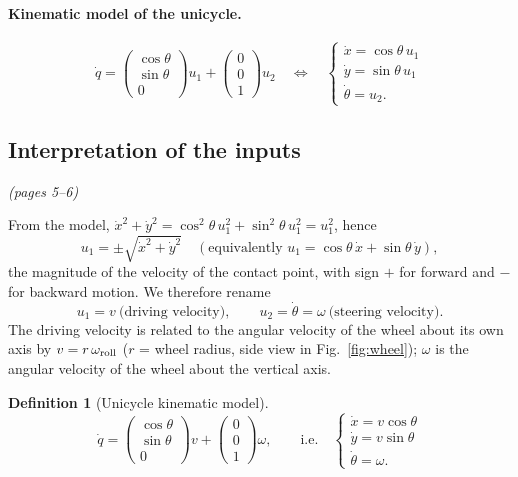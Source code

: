 \documentclass[11pt,a4paper]{article}
\newcommand{\dq}{\dot q}
\theoremstyle{definition}
\newtheorem{definition}[theorem]{Definition}
\begin{document}
\paragraph{Kinematic model of the unicycle.}
\[
\dq=\begin{pmatrix}\cos\theta\\ \sin\theta\\ 0\end{pmatrix}u_1+\begin{pmatrix}0\\0\\1\end{pmatrix}u_2
\quad\Longleftrightarrow\quad
\begin{cases}\dot x=\cos\theta\,u_1\\ \dot y=\sin\theta\,u_1\\ \dot\theta=u_2 .\end{cases}
\]

\subsection{Interpretation of the inputs}\emph{(pages 5--6)}

From the model, $\dot x^2+\dot y^2=\cos^2\theta\,u_1^2+\sin^2\theta\,u_1^2=u_1^2$, hence
\[
u_1=\pm\sqrt{\dot x^2+\dot y^2}\quad(\text{equivalently }u_1=\cos\theta\,\dot x+\sin\theta\,\dot y),
\]
the magnitude of the velocity of the contact point, with sign $+$ for forward and $-$ for backward motion. We therefore rename
\[
u_1=v\ \text{(driving velocity)},\qquad u_2=\dot\theta=\omega\ \text{(steering velocity)} .
\]
The driving velocity is related to the angular velocity of the wheel about its own axis by $v=r\,\omega_{\rm roll}$ ($r$ = wheel radius, side view in Fig.~\ref{fig:wheel}); $\omega$ is the angular velocity of the wheel about the vertical axis.

\begin{definition}[Unicycle kinematic model]
\[
\dq=\begin{pmatrix}\cos\theta\\ \sin\theta\\ 0\end{pmatrix}v+\begin{pmatrix}0\\0\\1\end{pmatrix}\omega,
\qquad\text{i.e.}\quad
\begin{cases}\dot x=v\cos\theta\\ \dot y=v\sin\theta\\ \dot\theta=\omega .\end{cases}
\]
\end{definition}
\end{document}
